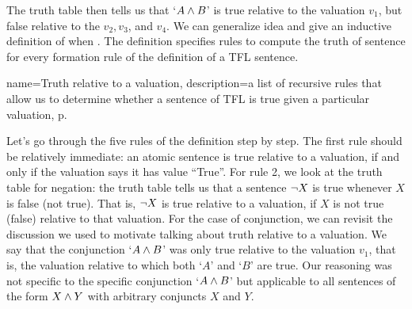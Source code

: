  The truth table then tells us that `$A\mathbin{\wedge} B$' is true relative to the valuation $v_1$, but false relative to the $v_2,v_3$, and $v_4$. We can generalize idea and give an inductive definition of when .  The definition specifies rules to compute the truth of sentence for every formation rule of the definition of a TFL sentence.


{
name=Truth relative to a valuation,
description={a list of recursive rules that allow us to determine whether a sentence of TFL is true given a particular valuation, p.~\pageref{Truthval}}
}

Let's go through the five rules of the definition step by step. The first rule should be relatively immediate: an atomic sentence is true relative to a valuation, if and only if the valuation says it has value ``True''. For rule 2, we look at the truth table for negation: the truth table tells us that a sentence $\neg X$ is true whenever $X$ is false (not true). That is, $\neg X$ is true relative to a valuation, if $X$ is not true (false) relative to that valuation. For the case of conjunction, we can revisit the discussion we used to motivate talking about truth relative to a valuation. We say that the conjunction `$A\mathbin{\wedge} B$' was only true relative to the valuation $v_1$, that is, the valuation relative to which both `$A$' and `$B$' are true. Our reasoning was not specific to the specific conjunction `$A\mathbin{\wedge} B$' but applicable to all sentences of the form $X\mathbin{\wedge} Y$ with arbitrary conjuncts $X$ and $Y$.

